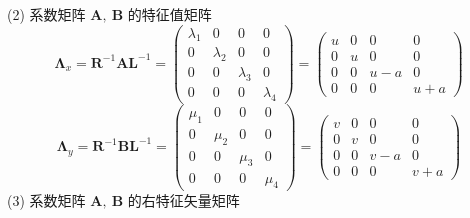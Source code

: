 \documentclass[12pt]{article}
\begin{document}
(2) 系数矩阵 $\bm{A},\ \bm{B}$ 的特征值矩阵
\begin{equation}
	\bm{\Lambda}_{x}=\bm{R}^{-1} \bm{A} \bm{L}^{-1}=\left(\begin{array}{cccc}
			\lambda_{1} & 0           & 0           & 0           \\
			0           & \lambda_{2} & 0           & 0           \\
			0           & 0           & \lambda_{3} & 0           \\
			0           & 0           & 0           & \lambda_{4}
		\end{array}\right)=\left(\begin{array}{cccc}
			u & 0 & 0   & 0   \\
			0 & u & 0   & 0   \\
			0 & 0 & u-a & 0   \\
			0 & 0 & 0   & u+a
		\end{array}\right)
\end{equation}
\begin{equation}
	\bm{\Lambda}_{y}=\bm{R}^{-1} \bm{B} \bm{L}^{-1}  =\left(
	\begin{array}{cccc}
			\mu_{1} & 0       & 0       & 0       \\
			0       & \mu_{2} & 0       & 0       \\
			0       & 0       & \mu_{3} & 0       \\
			0       & 0       & 0       & \mu_{4}
		\end{array}\right)  =\left(\begin{array}{cccc}
			v & 0 & 0   & 0   \\
			0 & v & 0   & 0   \\
			0 & 0 & v-a & 0   \\
			0 & 0 & 0   & v+a
		\end{array}\right)
\end{equation}
(3) 系数矩阵 $\bm{A},\ \bm{B}$ 的右特征矢量矩阵
\end{document}
